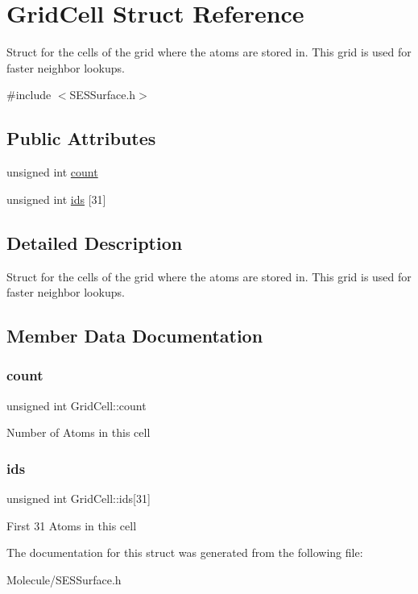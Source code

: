 \hypertarget{struct_grid_cell}{}\section{Grid\+Cell Struct Reference}
\label{struct_grid_cell}


Struct for the cells of the grid where the atoms are stored in. This grid is used for faster neighbor lookups.  




{\ttfamily \#include $<$S\+E\+S\+Surface.\+h$>$}

\subsection*{Public Attributes}
\begin{DoxyCompactItemize}
\item 
unsigned int \mbox{\hyperlink{struct_grid_cell_a3d2119436661fb8e66ddc277e6a40921}{count}}
\item 
unsigned int \mbox{\hyperlink{struct_grid_cell_aeb407f275e412887229c43f17c9aa944}{ids}} \mbox{[}31\mbox{]}
\end{DoxyCompactItemize}


\subsection{Detailed Description}
Struct for the cells of the grid where the atoms are stored in. This grid is used for faster neighbor lookups. 



\subsection{Member Data Documentation}
\mbox{\label{struct_grid_cell_a3d2119436661fb8e66ddc277e6a40921}} 
\subsubsection{\texorpdfstring{count}{count}}
{\footnotesize\ttfamily unsigned int Grid\+Cell\+::count}

Number of Atoms in this cell \mbox{\label{struct_grid_cell_aeb407f275e412887229c43f17c9aa944}} 
\subsubsection{\texorpdfstring{ids}{ids}}
{\footnotesize\ttfamily unsigned int Grid\+Cell\+::ids\mbox{[}31\mbox{]}}

First 31 Atoms in this cell 

The documentation for this struct was generated from the following file\+:\begin{DoxyCompactItemize}
\item 
Molecule/S\+E\+S\+Surface.\+h\end{DoxyCompactItemize}
